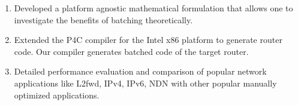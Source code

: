 \begin{enumerate}
\item Developed a platform agnostic mathematical formulation that allows one to investigate the benefits of batching theoretically.
\item Extended the P4C compiler for the Intel x86 platform to generate router code. Our compiler generates batched code of the target router.
\item Detailed performance evaluation and comparison of popular network applications like L2fwd, IPv4, IPv6, NDN with other popular manually optimized applications.
\end{enumerate}
